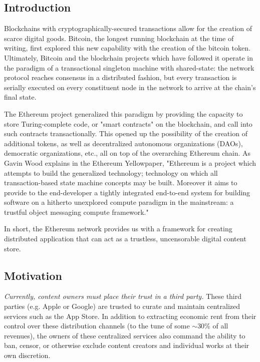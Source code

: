 \documentclass[12pt,oneside]{amsart}
\begin{document}
\setlength{\columnsep}{20pt}
\begin{multicols}{2}

\section{Introduction}\label{sec:introduction}

Blockchains with cryptographically-secured transactions allow for the creation of scarce digital goods.
Bitcoin, the longest running blockchain at the time of writing, first explored this new capability with the creation of the bitcoin token.
Ultimately, Bitcoin and the blockchain projects which have followed it operate in the paradigm of a transactional singleton machine with shared-state: the network protocol reaches consensus in a distributed fashion, but every transaction is serially executed on every constituent node in the network to arrive at the chain's final state.

The Ethereum project generalized this paradigm by providing the capacity to store Turing-complete code, or "smart contracts" on the blockchain, and call into such contracts transactionally.
This opened up the possibility of the creation of additional tokens, as well as decentralized autonomous organizations (DAOs), democratic organizations, etc., all on top of the overarching Ethereum chain.
As Gavin Wood explains in the Ethereum Yellowpaper, "Ethereum is a project which attempts to build the generalized technology; technology on which all transaction-based state machine concepts may be built. Moreover it aims to provide to the end-developer a tightly integrated end-to-end system for building software on a hitherto unexplored compute paradigm in the mainstream: a trustful object messaging compute framework."

In short, the Ethereum network provides us with a framework for creating distributed application that can act as a trustless, uncensorable digital content store.

\subsection{Motivation} \label{ch:motivation}

\textit{Currently, content owners must place their trust in a third party.}
These third parties (e.g. Apple or Google) are trusted to curate and maintain centralized services such as the App Store.
In addition to extracting economic rent from their control over these distribution channels (to the tune of some $\sim$30\% of all revenues), the owners of these centralized services also command the ability to ban, censor, or otherwise exclude content creators and individual works at their own discretion.


\end{multicols}
\end{document}
